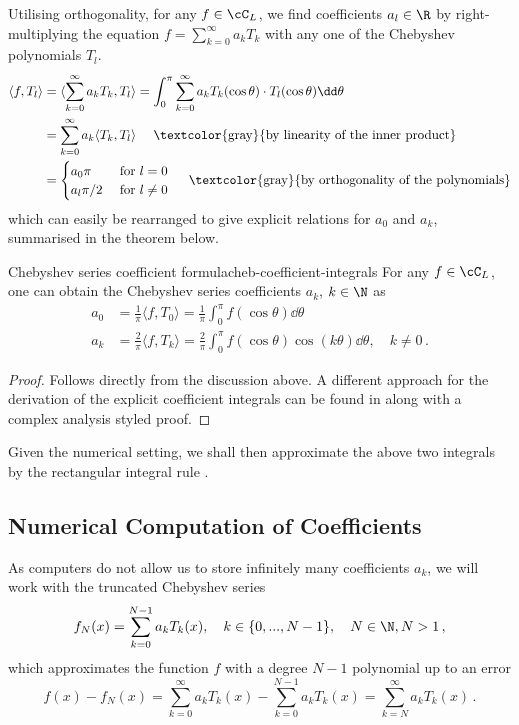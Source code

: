 \documentclass[12pt, a4paper]{article}
\newcommand{\chebyshev}{Chebyshev\xspace}
\begin{document}
  Utilising orthogonality, for any $f \in \cC_L$, we find coefficients $a_l \in \R$ by right-multiplying the equation $f = \sum_{k=0}^\infty a_k T_k$ with any one of the \chebyshev polynomials $T_l$.
  \begin{align*}
    \langle f, T_l \rangle & = \langle \sum_{k=0}^\infty a_k T_k, T_l \rangle = \int_0^\pi \sum_{k=0}^\infty a_k T_k(\cos \theta) \cdot T_l(\cos \theta) \dd\theta \\
                           & = \sum_{k=0}^\infty a_k \langle T_k, T_l \rangle \quad \text{ \textcolor{gray}{by linearity of the inner product}}                    \\
                           & = \begin{cases}
                                 a_0 \pi   & \text{ for } l = 0    \\
                                 a_l \pi/2 & \text{ for } l \neq 0
                               \end{cases} \quad \text{ \textcolor{gray}{by orthogonality of the polynomials}}
  \end{align*}
  which can easily be rearranged to give explicit relations for $a_0$ and $a_k$, summarised in the theorem below.
  \begin{theorem}{Chebyshev series coefficient formula}{cheb-coefficient-integrals}
    For any $f \in \cC_L$, one can obtain the \chebyshev series coefficients $a_k$, $k \in \N$ as
    \begin{align*}
      a_0 & = \frac{1}{\pi} \langle f, T_0 \rangle =  \frac{1}{\pi} \int_0^\pi f(\cos \theta) \dd\theta                                   \\
      a_k & = \frac{2}{\pi} \langle f, T_k \rangle = \frac{2}{\pi} \int_0^\pi f(\cos \theta) \cos(k \theta) \dd\theta, \quad k \neq 0 \,.
    \end{align*}
  \end{theorem}
  \begin{proof}
    Follows directly from the discussion above.
    A different approach for the derivation of the explicit coefficient integrals can be found in \cite{atap} along with a complex analysis styled proof.
  \end{proof}

  Given the numerical setting, we shall then approximate the above two integrals by the rectangular integral rule \parencite{bonthuis-cp}.

  \subsection{Numerical Computation of Coefficients}
  \label{subsection:numerical-coeffs}
  As computers do not allow us to store infinitely many coefficients $a_k$, we will work with the truncated \chebyshev series
  \begin{equation}
    f_N(x) = \sum_{k=0}^{N-1} a_k T_k(x), \quad k \in \{0, ..., N-1\},\quad N \in \N, N > 1\,,
    \label{eq:truncated-cheb-series}
  \end{equation}
  which approximates the function $f$ with a degree $N-1$ polynomial up to an error
  $$f(x) - f_N(x) = \sum_{k=0}^{\infty} a_k T_k(x) - \sum_{k=0}^{N-1} a_k T_k(x) = \sum_{k=N}^{\infty} a_k T_k(x) \,.$$
\end{document}
